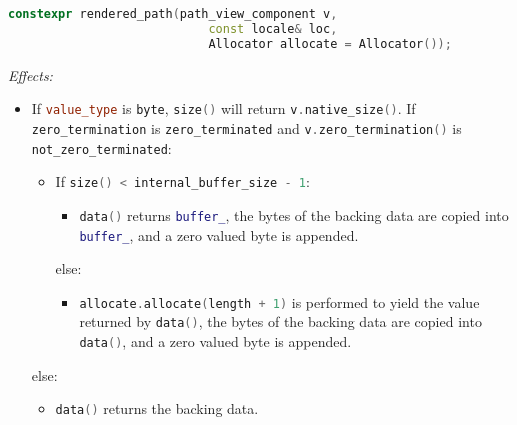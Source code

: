 \documentclass[11pt]{article}
\newcommand{\code}[2][cpp]{\lstinline[language=#1,basicstyle=\small\ttfamily]{#2}}
\newcommand{\desc}[1]{\textit{#1}}
\newcommand{\effects}{\desc{Effects: }}
\begin{document}
\begin{lstlisting}[language=cpp]
    constexpr rendered_path(path_view_component v,
                            const locale& loc,
                            Allocator allocate = Allocator());
\end{lstlisting}

\effects
\begin{itemize}
    \item If \code{value_type} is \code{byte}, \code{size()} will return \code{v.native_size()}. If \code{zero_termination} is \code{zero_terminated} and \code{v.zero_termination()} is \code{not_zero_terminated}:
    \begin{itemize}
        \item If \code{size() < internal_buffer_size - 1}:
        \begin{itemize}
            \item \code{data()} returns \code{buffer_}, the bytes of the backing data are copied into \code{buffer_}, and a zero valued byte is appended. 
        \end{itemize}
        else:
        \begin{itemize}
            \item \code{allocate.allocate(length + 1)} is performed to yield the value returned by \code{data()}, the bytes of the backing data are copied into \code{data()}, and a zero valued byte is appended.
        \end{itemize}
    \end{itemize}
    else:
    \begin{itemize}
        \item \code{data()} returns the backing data.
    \end{itemize}
    

\end{itemize}
\end{document}
